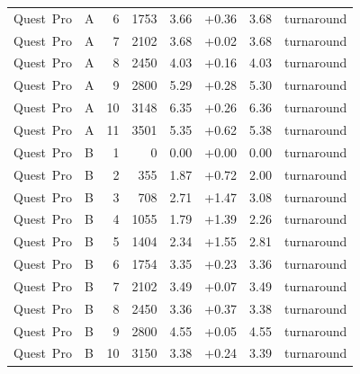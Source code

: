 \documentclass[11pt,a4paper]{article}
\begin{document}
{\begin{longtable}{llrrrrrl}
Quest~Pro & A & 6 & 1753 & 3.66 & +0.36 & 3.68 & turnaround \\
Quest~Pro & A & 7 & 2102 & 3.68 & +0.02 & 3.68 & turnaround \\
Quest~Pro & A & 8 & 2450 & 4.03 & +0.16 & 4.03 & turnaround \\
Quest~Pro & A & 9 & 2800 & 5.29 & +0.28 & 5.30 & turnaround \\
Quest~Pro & A & 10 & 3148 & 6.35 & +0.26 & 6.36 & turnaround \\
Quest~Pro & A & 11 & 3501 & 5.35 & +0.62 & 5.38 & turnaround \\
\addlinespace
Quest~Pro & B & 1 & 0 & 0.00 & +0.00 & 0.00 & turnaround \\
Quest~Pro & B & 2 & 355 & 1.87 & +0.72 & 2.00 & turnaround \\
Quest~Pro & B & 3 & 708 & 2.71 & +1.47 & 3.08 & turnaround \\
Quest~Pro & B & 4 & 1055 & 1.79 & +1.39 & 2.26 & turnaround \\
Quest~Pro & B & 5 & 1404 & 2.34 & +1.55 & 2.81 & turnaround \\
Quest~Pro & B & 6 & 1754 & 3.35 & +0.23 & 3.36 & turnaround \\
Quest~Pro & B & 7 & 2102 & 3.49 & +0.07 & 3.49 & turnaround \\
Quest~Pro & B & 8 & 2450 & 3.36 & +0.37 & 3.38 & turnaround \\
Quest~Pro & B & 9 & 2800 & 4.55 & +0.05 & 4.55 & turnaround \\
Quest~Pro & B & 10 & 3150 & 3.38 & +0.24 & 3.39 & turnaround \\
\end{longtable}
}
\end{document}
